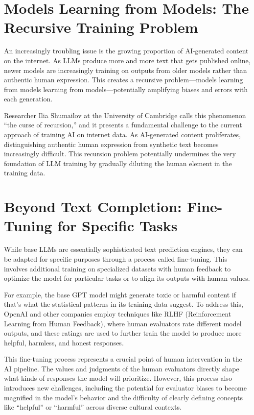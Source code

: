 \documentclass[
  Letterpaper,
]{scrbook}
\begin{document}
\section{Models Learning from Models: The Recursive Training
Problem}\label{models-learning-from-models-the-recursive-training-problem}

An increasingly troubling issue is the growing proportion of
AI-generated content on the internet. As LLMs produce more and more text
that gets published online, newer models are increasingly training on
outputs from older models rather than authentic human expression. This
creates a recursive problem---models learning from models learning from
models---potentially amplifying biases and errors with each generation.

Researcher Ilia Shumailov at the University of Cambridge calls this
phenomenon ``the curse of recursion,'' and it presents a fundamental
challenge to the current approach of training AI on internet data. As
AI-generated content proliferates, distinguishing authentic human
expression from synthetic text becomes increasingly difficult. This
recursion problem potentially undermines the very foundation of LLM
training by gradually diluting the human element in the training data.

\section{Beyond Text Completion: Fine-Tuning for Specific
Tasks}\label{beyond-text-completion-fine-tuning-for-specific-tasks}

While base LLMs are essentially sophisticated text prediction engines,
they can be adapted for specific purposes through a process called
fine-tuning. This involves additional training on specialized datasets
with human feedback to optimize the model for particular tasks or to
align its outputs with human values.

For example, the base GPT model might generate toxic or harmful content
if that's what the statistical patterns in its training data suggest. To
address this, OpenAI and other companies employ techniques like RLHF
(Reinforcement Learning from Human Feedback), where human evaluators
rate different model outputs, and these ratings are used to further
train the model to produce more helpful, harmless, and honest responses.

This fine-tuning process represents a crucial point of human
intervention in the AI pipeline. The values and judgments of the human
evaluators directly shape what kinds of responses the model will
prioritize. However, this process also introduces new challenges,
including the potential for evaluator biases to become magnified in the
model's behavior and the difficulty of clearly defining concepts like
``helpful'' or ``harmful'' across diverse cultural contexts.
\end{document}
